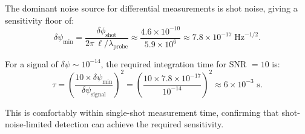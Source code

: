 \documentclass[aps,prd,twocolumn,superscriptaddress,nofootinbib,floatfix]{revtex4-2}
\newcommand{\psifield}{\psi}
\newcommand{\ee}[1]{\times 10^{#1}}
\begin{document}
The dominant noise source for differential measurements is shot
noise, giving a sensitivity floor of:
\begin{equation}
\delta\psifield_{\text{min}} = \frac{\delta\phi_{\text{shot}}}
{2\pi\,\ell/\lambda_{\text{probe}}}
\approx \frac{4.6\ee{-10}}{5.9\ee{6}}
\approx 7.8\ee{-17}\;\text{Hz}^{-1/2}.
\label{eq:sensitivity_floor}
\end{equation}

For a signal of $\delta\psifield \sim 10^{-14}$, the required
integration time for SNR $= 10$ is:
\begin{equation}
\tau = \left(\frac{10\times\delta\psifield_{\text{min}}}
{\delta\psifield_{\text{signal}}}\right)^2
= \left(\frac{10\times 7.8\ee{-17}}{10^{-14}}\right)^2
\approx 6\ee{-3}\text{ s}.
\label{eq:integration_time}
\end{equation}

This is comfortably within single-shot measurement time,
confirming that shot-noise-limited detection can achieve the
required sensitivity.
\end{document}

